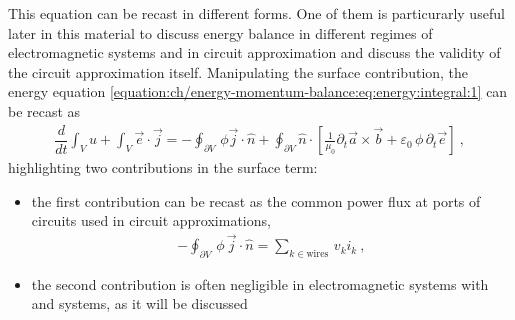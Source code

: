 \documentclass[letterpaper,10pt,english]{jupyterBook}
\begin{document}
\sphinxAtStartPar
This equation can be recast in different forms. One of them is particurarly useful later in this material to discuss energy balance in different regimes of electromagnetic systems and in circuit approximation and discuss the validity of the circuit approximation itself.
Manipulating the surface contribution, the energy equation \eqref{equation:ch/energy-momentum-balance:eq:energy:integral:1} can be recast as
\begin{equation}\label{equation:ch/energy-momentum-balance:eq:energy:integral:2}
\begin{split}\dfrac{d}{dt} \int_V u + \int_{V} \vec{e} \cdot \vec{j} = - \oint_{\partial V} \, \phi \vec{j} \cdot \hat{n} + \oint_{\partial V} \hat{n} \cdot \left[ \frac{1}{\mu_0} \partial_t \vec{a} \times \vec{b} + \varepsilon_0 \, \phi\, \partial_t \vec{e} \right] \ ,\end{split}
\end{equation}
\sphinxAtStartPar
highlighting two contributions in the surface term:
\begin{itemize}
\item {} 
\sphinxAtStartPar
the first contribution can be recast as the common power flux at ports of circuits used in circuit approximations,
\begin{equation*}
\begin{split}- \oint_{\partial V} \, \phi \, \vec{j} \cdot \hat{n} = \sum_{k \in \text{wires}} \, v_k  i_k \ ,\end{split}
\end{equation*}
\item {} 
\sphinxAtStartPar
the second contribution is often negligible in electromagnetic systems with  and  systems, as it will be discussed  

\end{itemize}
\end{document}
